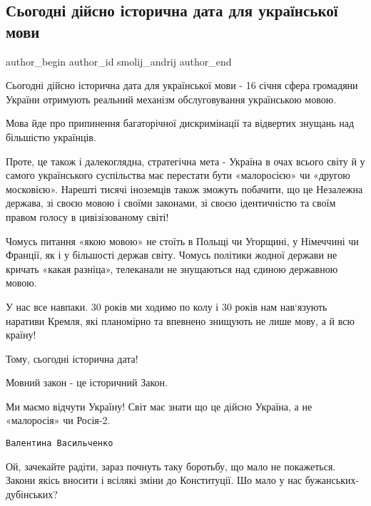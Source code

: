  
 
 
 
 
\subsection{Сьогодні дійсно історична дата для української мови}
\ifcmt
  author_begin
   author_id smolij_andrij
  author_end
\fi

Сьогодні дійсно історична дата для української мови - 16 січня сфера громадяни
України отримують реальний механізм обслуговування українською мовою. 

Мова йде про припинення багаторічної дискримінації та відвертих знущань над
більшістю українців.

Проте, це також і далекоглядна, стратегічна мета - Україна в очах всього світу
й у самого українського суспільства має перестати бути «малоросією» чи «другою
московією». Нарешті тисячі іноземців також зможуть побачити, що це Незалежна
держава, зі своєю мовою і своїми законами, зі своєю ідентичністю та своїм
правом голосу в цивізізованому світі! 

Чомусь питання «якою мовою» не стоїть в Польщі чи Угорщині, у Німеччині чи
Франції, як і у більшості держав світу. Чомусь політики жодної держави не
кричать «какая разніца», телеканали не знущаються над єдиною державною мовою. 

У нас все навпаки. 30 років ми ходимо по колу і 30 років нам нав‘язують
наративи Кремля, які планомірно та впевнено знищують не лише мову, а й всю
країну! 

Тому, сьогодні історична дата! 

Мовний закон - це історичний Закон. 

Ми маємо відчути Україну! Світ має знати що це дійсно Україна, а не «малоросія»
чи Росія-2.

\begin{itemize}
\verb|Валентина Васильченко|

Ой, зачекайте радіти, зараз почнуть таку боротьбу, що мало не покажеться.
Закони якісь вносити і всілякі зміни до Конституції. Шо мало у
нас бужанських-дубінських?

\end{itemize}
